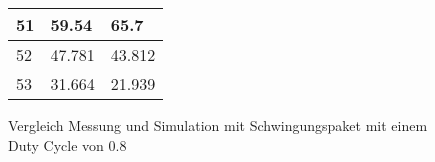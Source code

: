 \begin{appendix}
\begin{figure}[ht!]
\begin{minipage}[b]{0.4\textwidth}
\begin{tabular}{|l|l|l|}
			51                                                              & 59.54                                                            & 65.7                                                         \\ \hline
			52                                                              & 47.781                                                           & 43.812                                                       \\ \hline
			53                                                              & 31.664                                                           & 21.939                                                       \\ \hline
		\end{tabular}
		\caption{Vergleich Messung und Simulation mit Schwingungspaket mit einem Duty Cycle von 0.8}\label{tab:Vergleich_Schwing_80}
	\end{minipage}
\end{figure}



\newpage

\end{appendix}
